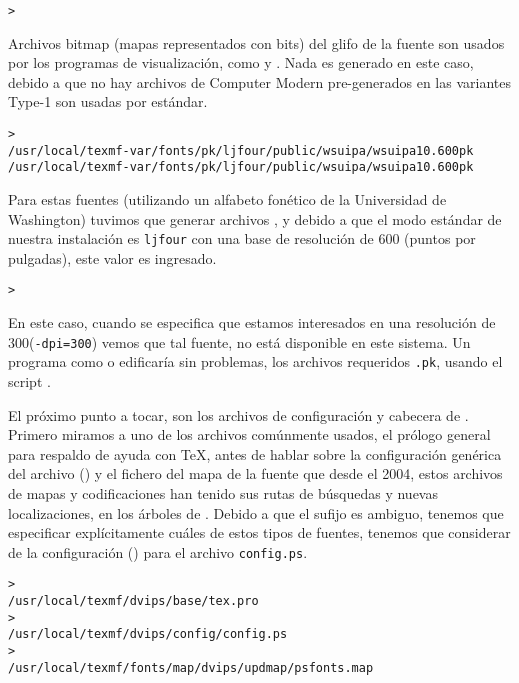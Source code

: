 \documentclass{article}
\begin{document}
\begin{alltt}
	> 
\end{alltt}
Archivos bitmap (mapas representados con bits) del glifo de la fuente  son usados por los
programas de visualización, como  y .
Nada es generado en este caso, debido a que no hay archivos de
Computer Modern pre-generados  en \TL{}\Dash las variantes
Type-1 son usadas por estándar.
\begin{alltt}
	> 
	\ifSingleColumn
	/usr/local/texmf-var/fonts/pk/ljfour/public/wsuipa/wsuipa10.600pk
	\else /usr/local/texmf-var/fonts/pk/ljfour/public/wsuipa/wsuipa10.600pk
\fi\end{alltt}
Para estas fuentes (utilizando un alfabeto fonético de la Universidad de
Washington) tuvimos que generar archivos , y debido a que el
modo estándar \MF{} de nuestra instalación es \texttt{ljfour} con una
base de resolución de 600\dpi{} (puntos por pulgadas), este valor es
ingresado.
\begin{alltt}
	> 
\end{alltt}
En este caso, cuando se especifica que estamos interesados en una
resolución de 300\dpi (\texttt{-dpi=300}) vemos que tal fuente, no
está disponible en este sistema.
Un programa como  o  edificaría sin
problemas, los archivos requeridos \texttt{.pk}, usando el script
.

El próximo punto a tocar, son los archivos de configuración y cabecera
de . Primero miramos a uno de los archivos comúnmente
usados, el prólogo general  para respaldo de ayuda con
\TeX{}, antes de hablar sobre la configuración genérica del archivo
() y el fichero del mapa  de la fuente
\PS{}\Dash que desde el 2004, estos archivos de mapas y codificaciones
han tenido sus rutas de búsquedas y nuevas localizaciones, en los
árboles de .  Debido a que el sufijo  es
ambiguo, tenemos que especificar explícitamente cuáles de estos tipos
de fuentes, tenemos que considerar de la configuración () para el archivo \texttt{config.ps}.
\begin{alltt}
> 
   /usr/local/texmf/dvips/base/tex.pro
> 
   /usr/local/texmf/dvips/config/config.ps
> 
   /usr/local/texmf/fonts/map/dvips/updmap/psfonts.map
\end{alltt}
\end{document}
